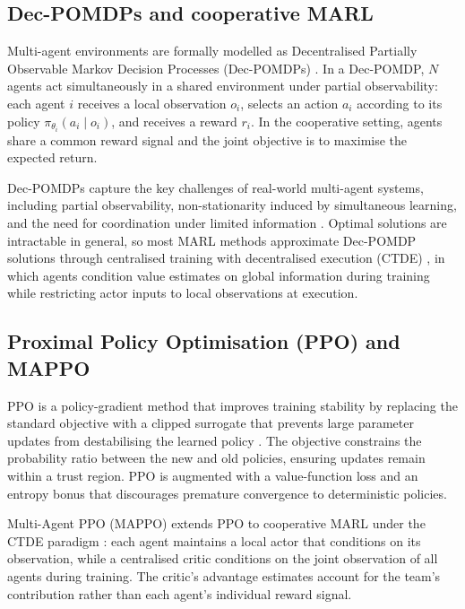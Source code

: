\subsection*{Dec-POMDPs and cooperative MARL}
Multi-agent environments are formally modelled as Decentralised Partially Observable Markov Decision Processes (Dec-POMDPs) \cite{bernstein2002complexity}. In a Dec-POMDP, $N$ agents act simultaneously in a shared environment under partial observability: each agent $i$ receives a local observation $o_i$, selects an action $a_i$ according to its policy $\pi_{\theta_i}(a_i \mid o_i)$, and receives a reward $r_i$. In the cooperative setting, agents share a common reward signal and the joint objective is to maximise the expected return.

Dec-POMDPs capture the key challenges of real-world multi-agent systems, including partial observability, non-stationarity induced by simultaneous learning, and the need for coordination under limited information \cite{wong2023deep}. Optimal solutions are intractable in general, so most MARL methods approximate Dec-POMDP solutions through centralised training with decentralised execution (CTDE) \cite{amato2015scalable}, in which agents condition value estimates on global information during training while restricting actor inputs to local observations at execution.

\subsection*{Proximal Policy Optimisation (PPO) and MAPPO}
PPO is a policy-gradient method that improves training stability by replacing the standard objective with a clipped surrogate that prevents large parameter updates from destabilising the learned policy \cite{yu2022surprising}. The objective constrains the probability ratio between the new and old policies, ensuring updates remain within a trust region. PPO is augmented with a value-function loss and an entropy bonus that discourages premature convergence to deterministic policies.

Multi-Agent PPO (MAPPO) extends PPO to cooperative MARL under the CTDE paradigm \cite{yu2022surprising}: each agent maintains a local actor that conditions on its observation, while a centralised critic conditions on the joint observation of all agents during training. The critic's advantage estimates account for the team's contribution rather than each agent's individual reward signal.

